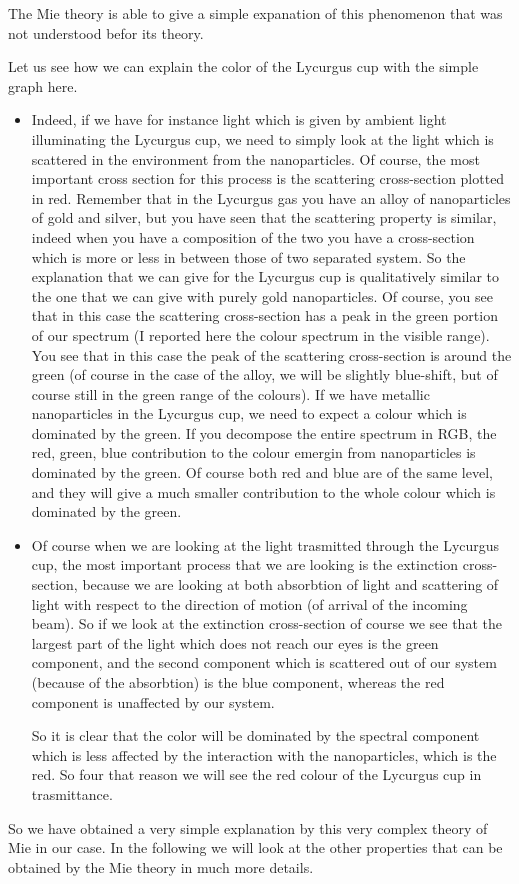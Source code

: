 \documentclass[../main/main.tex]{subfiles}
\begin{document}
The Mie theory is able to give a simple expanation of this phenomenon that was not understood befor its theory.

Let us see how we can explain the color of the Lycurgus cup with the simple graph here.
\begin{itemize}
\item Indeed, if we have for instance light which is given by ambient light illuminating the Lycurgus cup, we need to simply look at the light which is scattered in the environment from the nanoparticles. Of course, the most important cross section for this process is the scattering cross-section plotted in red.
Remember that in the Lycurgus gas you have an alloy of nanoparticles of gold and silver, but you have seen that the scattering property is similar, indeed when you have a composition of the two you have a cross-section which is more or less in between those of two separated system. So the explanation that we can give for the Lycurgus cup is qualitatively similar to the one that we can give with purely gold nanoparticles. Of  course, you see that in this case the scattering cross-section has a peak in the green portion of our spectrum (I reported here the colour spectrum in the visible range). You see that in this case the peak of the scattering cross-section is around the green (of course in the case of the alloy, we will be slightly blue-shift, but of course still in the green range of the colours). If we have metallic nanoparticles in the Lycurgus cup, we need to expect a colour which is dominated by the green. If you decompose the entire spectrum in RGB, the red, green, blue  contribution to the colour emergin from nanoparticles is dominated by the green. Of course both red and blue are of the same level, and they will give a much smaller contribution to the whole colour which is dominated by the green.

\item Of course when we are looking at the light trasmitted through the Lycurgus cup, the most important process that we are looking is the extinction cross-section, because we are looking at both absorbtion of light and scattering of light with respect to the direction of motion (of arrival of the incoming beam). So if we look at the extinction cross-section of course we see that the largest part of the light which does not reach our eyes is the green component, and the second component which is scattered out of our system (because of the absorbtion) is the blue component, whereas the red component is unaffected by our system.

So it is clear that the color will be dominated by the spectral component which is less affected by the interaction with the nanoparticles, which is the red. So four that reason we will see the red colour of the Lycurgus cup in trasmittance.

\end{itemize}
So we have obtained a very simple explanation by this very complex theory of Mie in our case. In the following we will look at the other properties that can be obtained by the Mie theory in much more details.


\clearpage
\end{document}
